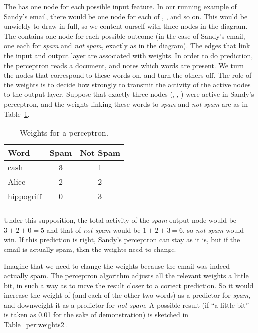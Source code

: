The  has one node for each possible input
feature. In our running example of Sandy's email, there would be one
node for each of , ,  and so on.  This would be unwieldy to draw in
full, so we content ourself with three nodes in the diagram.  The
 contains one node for each possible outcome (in
the case of Sandy's email, one each for \emph{spam} and \emph{not spam},
exactly as in the diagram).  The edges that link the input and output
layer are associated with weights. In order
to do prediction, the perceptron reads a document, and notes which
words are present. We turn the nodes that correspond to these words
on, and turn the others off. The role of the weights is to decide how
strongly to transmit the activity of the active nodes to the output
layer. Suppose that exactly three nodes (,
, ) were active in Sandy's
perceptron, and the weights linking these words to \emph{spam} and \emph{not
spam} are as in Table~\ref{per:weights}.

\begin{table}
    \begin{tabular}{lcc}
    \lsptoprule
      Word & {Spam} & {Not Spam} \\\midrule
      cash & 3   & 1 \\ 
      Alice & 2 & 2 \\ 
      hippogriff & 0 & 3 \\
    \lspbottomrule
    \end{tabular}
	\caption{Weights for a perceptron.}
	\label{per:weights}
\end{table}

Under this supposition, the total activity of the \emph{spam} output node
would be \(3+2+0 = 5\) and that of \emph{not spam} would be \(1+2+3=6\),
so \emph{not spam} would win. If this prediction is right, Sandy's
perceptron can stay as it is, but if the email is actually spam,
then the weights need to change.

Imagine that we need to change the weights because the email was indeed actually spam.  The perceptron algorithm
adjusts all the relevant weights a little bit, in such a way as to
move the result closer to a correct prediction. So it would increase
the weight of  (and each of the other two words) as a
predictor for \emph{spam}, and downweight it as a predictor for
\emph{not spam}. A possible result (if ``a little bit'' is taken as
0.01 for the sake of demonstration) is sketched in
Table~\ref{per:weights2}.
 
